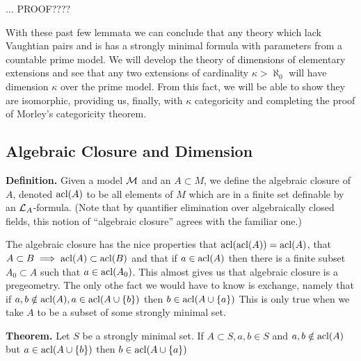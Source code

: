 {\color{red}\(\ldots\) PROOF????} %

With these past few lemmata we can conclude that any theory which lack Vaughtian pairs and is \omst has a strongly minimal formula with parameters from a countable prime model. 
We will develop the theory of dimensions of elementary extensions and see that any two extensions of cardinality \(\kappa > \aleph_0\) will have dimension \(\kappa\) over the prime model.
From this fact, we will be able to show they are isomorphic, providing us, finally, with \(\kappa\) categoricity and completing the proof of Morley's categoricity theorem. 

\subsection{Algebraic Closure and Dimension}

\textbf{Definition.} Given a model \(\mathcal{M}\) and an \(A \subset M\), we define the algebraic closure of \(A\), denoted \(\text{acl}(A)\) to be all elements of \(M\) which are in a finite set definable by an \(\mathcal{L}_A\)-formula. 
(Note that by quantifier elimination over algebraically closed fields, this notion of ``algebraic closure'' agrees with the familiar one.)

The algebraic closure has the nice properties that \(\text{acl}(\text{acl}(A)) = \text{acl}(A)\), that \(A \subset B \implies \text{acl}(A) \subset \text{acl}(B)\) and that if \(a \in \text{acl}(A)\) then there is a finite subset \(A_0 \subset A\) such that \(a \in \text{acl}(A_0)\).
This almost gives us that algebraic closure is a pregeometry. 
The only othe fact we would have to know is exchange, namely that if \(a, b \notin \text{acl}(A), a \in \text{acl}(A \cup \{b\})\) then \(b \in \text{acl}(A \cup \{a\})\) 
This is only true when we take \(A\) to be a subset of some strongly minimal set.

\textbf{Theorem.} Let \(S\) be a strongly minimal set. If \(A \subset S, a, b \in S\) and \(a, b \notin \text{acl}(A)\) but \(a \in \text{acl}(A \cup \{b\})\) then \(b \in \text{acl}(A \cup \{a\})\) 



